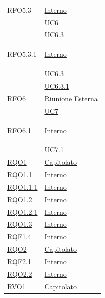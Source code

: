 \begin{longtable}{|>{\centering}m{5cm}|m{5cm}<{\centering}|}
\hypertarget{RFO5.3}{RFO5.3} &  \hyperlink{Interno}{Interno}\\
& \hyperref[UC6]{UC6}\\
& \hyperref[UC6.3]{UC6.3}\\ \hline

\hypertarget{RFO5.3.1}{RFO5.3.1} &  \hyperlink{Interno}{Interno}\\
& \hyperref[UC6.3]{UC6.3}\\
& \hyperref[UC6.3.1]{UC6.3.1}\\ \hline

\hyperlink{RFO6}{RFO6} & \hyperlink{Riunione Esterna}{Riunione Esterna}\\
& \hyperref[UC7]{UC7}\\ \hline

\hypertarget{RFO6.1}{RFO6.1} & \hyperlink{Interno}{Interno}\\
& \hyperref[UC7.1]{UC7.1}\\ \hline

\hyperlink{RQO1}{RQO1} & \hyperlink{Capitolato}{Capitolato}\\ \hline

\hyperlink{RQO1.1}{RQO1.1} & \hyperlink{Interno}{Interno}\\ \hline

\hyperlink{RQO1.1.1}{RQO1.1.1} & \hyperlink{Interno}{Interno}\\ \hline

\hyperlink{RQO1.2}{RQO1.2} & \hyperlink{Interno}{Interno}\\ \hline

\hyperlink{RQO1.2.1}{RQO1.2.1} & \hyperlink{Interno}{Interno}\\ \hline

\hyperlink{RQO1.3}{RQO1.3} & \hyperlink{Interno}{Interno}\\ \hline

\hyperlink{RQF1.4}{RQF1.4} & \hyperlink{Interno}{Interno}\\ \hline

\hyperlink{RQO2}{RQO2} & \hyperlink{Capitolato}{Capitolato}\\ \hline

\hyperlink{RQF2.1}{RQF2.1} & \hyperlink{Interno}{Interno}\\ \hline

\hyperlink{RQO2.2}{RQO2.2} & \hyperlink{Interno}{Interno}\\ \hline

\hyperlink{RVO1}{RVO1} & \hyperlink{Capitolato}{Capitolato}\\ \hline


\end{longtable}
